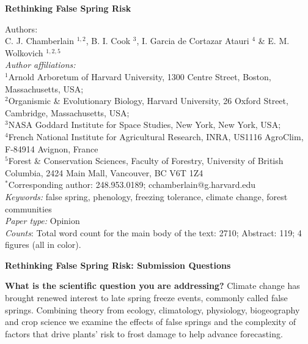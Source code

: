 \documentclass{article}\usepackage[]{graphicx}\usepackage[]{color}
\begin{document}
\noindent \textbf{\Large{Rethinking False Spring Risk}}

\noindent Authors:\\
C. J. Chamberlain $^{1,2}$, B. I. Cook $^{3}$, I. Garcia de Cortazar Atauri $^{4}$ \& E. M. Wolkovich $^{1,2,5}$
\vspace{2ex}\\
\emph{Author affiliations:}\\
$^{1}$Arnold Arboretum of Harvard University, 1300 Centre Street, Boston, Massachusetts, USA; \\
$^{2}$Organismic \& Evolutionary Biology, Harvard University, 26 Oxford Street, Cambridge, Massachusetts, USA; \\
$^{3}$NASA Goddard Institute for Space Studies, New York, New York, USA; \\
$^{4}$French National Institute for Agricultural Research, INRA, US1116 AgroClim, F-84914 Avignon, France\\
$^{5}$Forest \& Conservation Sciences, Faculty of Forestry, University of British Columbia, 2424 Main Mall, Vancouver, BC V6T 1Z4\\
\vspace{2ex}
$^*$Corresponding author: 248.953.0189; cchamberlain@g.harvard.edu\\

\noindent \emph{Keywords:} false spring, phenology, freezing tolerance, climate change, forest communities \\
\emph{Paper type:} Opinion\\
\emph{Counts}: Total word count for the main body of the text:  2710; Abstract: 119; 4 figures (all in color). \\

\renewcommand{\thetable}{\arabic{table}}
\renewcommand{\thefigure}{\arabic{figure}}
\renewcommand{\labelitemi}{$-$}


\newpage
\nobibliography*
\textbf{\Large{Rethinking False Spring Risk: Submission Questions}}


\textbf{What is the scientific question you are addressing?} 
Climate change has brought renewed interest to late spring freeze events, commonly called false springs. Combining theory from ecology, climatology, physiology, biogeography and crop science we examine the effects of false springs and the complexity of factors that drive plants' risk to frost damage to help advance forecasting. 
\end{document}
